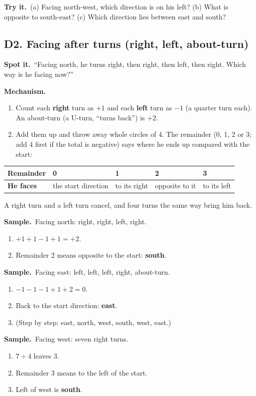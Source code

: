 \documentclass[11pt,a4paper]{article}
\let\oldsubsection\subsection
\renewcommand{\subsection}{\needspace{9\baselineskip}\oldsubsection}
\newcommand{\spot}{\textbf{\color{ember}Spot it.}\ }
\newcommand{\mech}{\textbf{\color{ember}Mechanism.}\ }
\newif\ifkeepsamp
\newcommand{\samp}{\ifkeepsamp\needspace{4\baselineskip}\fi\textbf{\color{ember}Sample.}\ }
\newcommand{\tryit}[1]{\textbf{\color{ember}Try it.}\ #1}
\begin{document}
\tryit (a) Facing north-west, which direction is on his left? (b) What is opposite to south-east? (c) Which direction lies between east and south?

\subsection{D2. Facing after turns (right, left, about-turn)}
\spot ``Facing north, he turns right, then right, then left, then right. Which way is he facing now?''

\mech
\begin{enumerate}
\item Count each \textbf{right} turn as $+1$ and each \textbf{left} turn as $-1$ (a quarter turn each). An about-turn (a U-turn, ``turns back'') is $+2$.
\item Add them up and throw away whole circles of 4. The remainder (0, 1, 2 or 3; add 4 first if the total is negative) says where he ends up compared with the start:
\end{enumerate}
\begin{center}\small\renewcommand{\arraystretch}{1.18}\setlength{\tabcolsep}{9pt}
\begin{tabular}{@{}lllll@{}}
\toprule
\textbf{\color{slate}Remainder} & 0 & 1 & 2 & 3 \\ \midrule
\textbf{\color{slate}He faces} & the start direction & to its right & opposite to it & to its left \\
\bottomrule
\end{tabular}\end{center}
A right turn and a left turn cancel, and four turns the same way bring him back.

\samp Facing north: right, right, left, right.
\begin{enumerate}
\item $+1 + 1 - 1 + 1 = +2$.
\item Remainder 2 means opposite to the start: \textbf{south}.
\end{enumerate}
\samp Facing east: left, left, left, right, about-turn.
\begin{enumerate}
\item $-1 - 1 - 1 + 1 + 2 = 0$.
\item Back to the start direction: \textbf{east}.
\item (Step by step: east, north, west, south, west, east.)
\end{enumerate}
\samp Facing west: seven right turns.
\begin{enumerate}
\item $7 \div 4$ leaves 3.
\item Remainder 3 means to the left of the start.
\item Left of west is \textbf{south}.
\end{enumerate}
\end{document}
